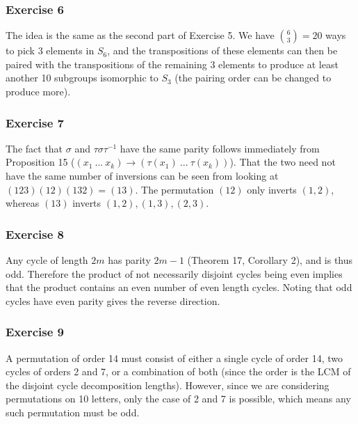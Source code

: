 \subsubsection{Exercise 6}
The idea is the same as the second part of Exercise 5. We have $\binom{6}{3} = 20$ ways to pick 3 elements in
$S_6$, and the transpositions of these elements can then be paired with the transpositions of the remaining 3
elements to produce at least another 10 subgroups isomorphic to $S_3$ (the pairing order can be changed to
produce more).

\subsubsection{Exercise 7}
The fact that $\sigma$ and $\tau \sigma \tau^{-1}$ have the same parity follows immediately from Proposition
15 ($(x_1 \: ...\:  x_k) \to (\tau(x_1) \: ... \: \tau(x_k))$). That the two need not have the same number of inversions
can be seen from looking at $(1 2 3) (1 2) (1 3 2) = (1 3)$. The permutation $(1 2)$ only inverts $(1, 2)$,
whereas $(1 3)$ inverts $(1, 2), (1, 3), (2, 3)$.

\subsubsection{Exercise 8}
Any cycle of length $2m$ has parity $2m - 1$ (Theorem 17, Corollary 2), and is thus odd. Therefore the product
of not necessarily disjoint cycles being even implies that the product contains an even number of even length
cycles. Noting that odd cycles have even parity gives the reverse direction.

\subsubsection{Exercise 9}
A permutation of order 14 must consist of either a single cycle of order 14, two cycles of orders 2 and 7, or
a combination of both (since the order is the LCM of the disjoint cycle decomposition lengths). However, since
we are considering permutations on 10 letters, only the case of 2 and 7 is possible, which means any such
permutation must be odd.

